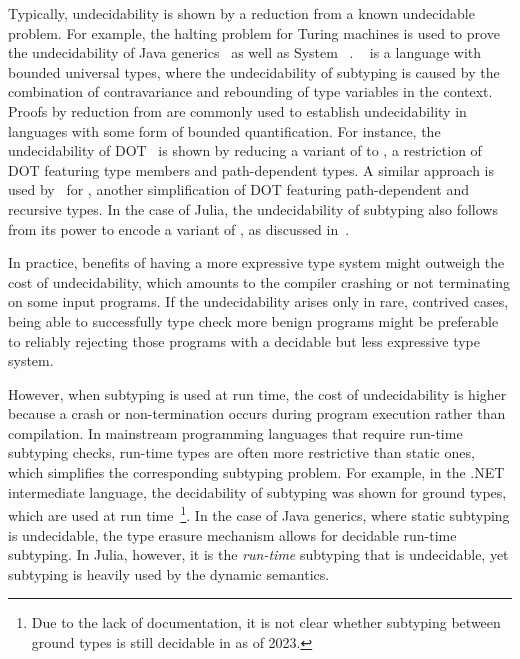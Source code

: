 Typically, undecidability is shown by a reduction from a known undecidable
problem. For example, the halting problem for Turing machines is used
to prove the undecidability of Java generics~\cite{bib:grigore:java-undec:2017}
as well as System \FSub~\cite{bib:pierce:bound-sub-undec:1992}.
\FSub~\cite{bib:cardelli:fsub:1991} is a language with bounded universal types,
where the undecidability of subtyping is caused by the combination of
contravariance and rebounding of type variables in the context.
Proofs by reduction from \FSub are commonly used to establish
undecidability in languages with some form of bounded quantification.
For instance, the undecidability of DOT~\cite{bib:hu:dot-undec:2020} is shown
by reducing a variant of \FSub to \DSub, a restriction of DOT featuring type
members and path-dependent types. A similar approach is used
by~\citet{bib:mackay:path-dep-dec:2020} for \WyvCore, another simplification of
DOT featuring path-dependent and recursive types.
In the case of Julia, the undecidability of subtyping also follows from its
power to encode a variant of \FSub,
as discussed in~.

In practice, benefits of having a more expressive type system might outweigh
the cost of undecidability, which amounts to the compiler crashing or
not terminating on some input programs.
If the undecidability arises only in rare, contrived cases,
being able to successfully type check more benign programs
might be preferable to reliably rejecting those
programs with a decidable but less expressive type system.

However, when subtyping is used at run time, the cost of undecidability is
higher because a crash or non-termination occurs during program execution
rather than compilation.
In mainstream programming languages that require run-time subtyping checks,
run-time types are often more restrictive than static ones,
which simplifies the corresponding subtyping problem.
For example, in the .NET intermediate language,
the decidability of subtyping was shown for ground types,
which are used at run time~\cite{bib:kennedy:nom-sub-var-dec:2007}\footnote{Due
to the lack of documentation, it is not clear whether subtyping between ground
types is still decidable in \CSharp as of 2023.}.
In the case of Java generics, where static subtyping is undecidable,
the type erasure mechanism allows for decidable run-time subtyping.
In Julia, however, it is the \emph{run-time} subtyping that is undecidable,
yet subtyping is heavily used by the dynamic semantics.

